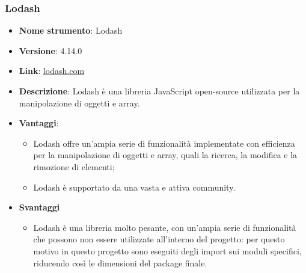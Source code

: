 \subsubsection{Lodash}
\begin{itemize}
      \item \textbf{Nome strumento}: Lodash
      \item \textbf{Versione}: 4.14.0
      \item \textbf{Link}: \href{https://lodash.com/}{lodash.com}
      \item \textbf{Descrizione}: Lodash è una libreria JavaScript open-source utilizzata per la manipolazione di oggetti e array.
      \item \textbf{Vantaggi}:
            \begin{itemize}
                  \item Lodash offre un'ampia serie di funzionalità implementate con efficienza per la manipolazione di oggetti e array,
                        quali la ricerca, la modifica e la rimozione di elementi;
                  \item Lodash è supportato da una vasta e attiva community.
            \end{itemize}
      \item \textbf{Svantaggi}
            \begin{itemize}
                  \item Lodash è una libreria molto pesante, con un'ampia serie di funzionalità che possono non essere utilizzate all'interno del progetto:
                        per questo motivo in questo progetto sono eseguiti degli import sui moduli specifici, riducendo così le dimensioni del package finale.
            \end{itemize}
\end{itemize}

